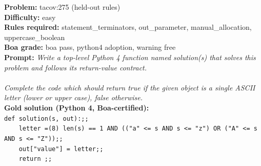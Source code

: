\begin{exbox}
  \textbf{Problem:} tacov:275 (held-out rules)\\
  \textbf{Difficulty:} easy\\
  \textbf{Rules required:} statement\_terminators, out\_parameter, manual\_allocation, uppercase\_boolean\\
  \textbf{Boa grade:} boa pass, python4 adoption, warning free\\[3pt]
  \textbf{Prompt:} \textit{Write a top-level Python 4 function named solution(s) that solves this problem and follows its return-value contract. \\
  \  \\
  Complete the code which should return \textasciigrave{}true\textasciigrave{} if the given object is a single ASCII letter (lower or upper case), \textasciigrave{}false\textasciigrave{} otherwise.}\\[3pt]
  \textbf{Gold solution (Python 4, Boa-certified):} \\
  \textup{\texttt{def solution(s, out):;;}} \\
  \textup{\texttt{~~~~letter =(8) len(s) == 1 AND (("a" \textless{}= s AND s \textless{}= "z") OR ("A" \textless{}= s AND s \textless{}= "Z"));;}} \\
  \textup{\texttt{~~~~out["value"] = letter;;}} \\
  \textup{\texttt{~~~~return ;;}}
\end{exbox}
